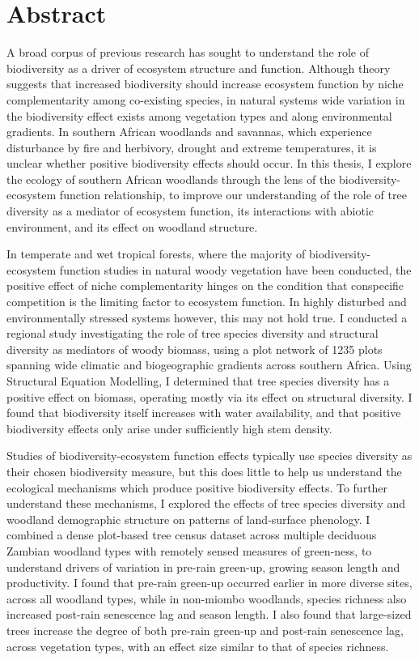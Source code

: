 \chapter*{Abstract}

\label{abstract}

A broad corpus of previous research has sought to understand the role of biodiversity as a driver of ecosystem structure and function. Although theory suggests that increased biodiversity should increase ecosystem function by niche complementarity among co-existing species, in natural systems wide variation in the biodiversity effect exists among vegetation types and along environmental gradients. In southern African woodlands and savannas, which experience disturbance by fire and herbivory, drought and extreme temperatures, it is unclear whether positive biodiversity effects should occur. In this thesis, I explore the ecology of southern African woodlands through the lens of the biodiversity-ecosystem function relationship, to improve our understanding of the role of tree diversity as a mediator of ecosystem function, its interactions with abiotic environment, and its effect on woodland structure. 

In temperate and wet tropical forests, where the majority of biodiversity-ecosystem function studies in natural woody vegetation have been conducted, the positive effect of niche complementarity hinges on the condition that conspecific competition is the limiting factor to ecosystem function. In highly disturbed and environmentally stressed systems however, this may not hold true. I conducted a regional study investigating the role of tree species diversity and structural diversity as mediators of woody biomass, using a plot network of 1235 plots spanning wide climatic and biogeographic gradients across southern Africa. Using Structural Equation Modelling, I determined that tree species diversity has a positive effect on biomass, operating mostly via its effect on structural diversity. I found that biodiversity itself increases with water availability, and that positive biodiversity effects only arise under sufficiently high stem density.

Studies of biodiversity-ecosystem function effects typically use species diversity as their chosen biodiversity measure, but this does little to help us understand the ecological mechanisms which produce positive biodiversity effects. To further understand these mechanisms, I explored the effects of tree species diversity and woodland demographic structure on patterns of land-surface phenology. I combined a dense plot-based tree census dataset across multiple deciduous Zambian woodland types with remotely sensed measures of green-ness, to understand drivers of variation in pre-rain green-up, growing season length and productivity. I found that pre-rain green-up occurred earlier in more diverse sites, across all woodland types, while in non-miombo woodlands, species richness also increased post-rain senescence lag and season length. I also found that large-sized trees increase the degree of both pre-rain green-up and post-rain senescence lag, across vegetation types, with an effect size similar to that of species richness.

